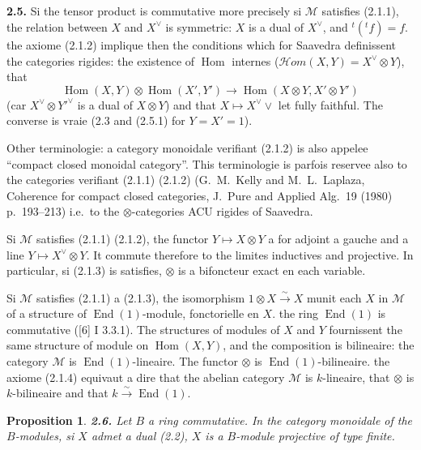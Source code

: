 \documentclass[12pt,a4paper]{article}
\theoremstyle{plain}
\newtheorem{proposition}[theorem]{Proposition}
\theoremstyle{definition}
\theoremstyle{remark}
\DeclareMathOperator{\Hom}{Hom}
\DeclareMathOperator{\End}{End}
\begin{document}
\subsection{}

\textbf{2.5.} Si the tensor product is commutative more precisely si $\mathcal{M}$ satisfies (2.1.1), the relation between $X$ and $X^\vee$ is symmetric: $X$ is a dual of $X^\vee$, and ${}^t({}^t f) = f$. the axiome (2.1.2) implique then the conditions which for Saavedra definissent the categories rigides: the existence of $\Hom$ internes ($\mathcal{H}om(X,Y) = X^\vee \otimes Y$), that
\begin{equation}\label{eq:2.5.1}
\Hom(X,Y) \otimes \Hom(X',Y') \to \Hom(X \otimes Y, X' \otimes Y')
\end{equation}
(car $X^\vee \otimes Y'^\vee$ is a dual of $X \otimes Y$) and that $X \mapsto X^\vee \vee$ let fully faithful. The converse is vraie (2.3 and (2.5.1) for $Y = X' = 1$).

Other terminologie: a category monoidale verifiant (2.1.2) is also appelee ``compact closed monoidal category''. This terminologie is parfois reservee also to the categories verifiant (2.1.1) (2.1.2) (G.~M.~Kelly and M.~L.~Laplaza, Coherence for compact closed categories, J.~Pure and Applied Alg.~19 (1980) p.~193--213) i.e.~to the $\otimes$-categories ACU rigides of Saavedra.

Si $\mathcal{M}$ satisfies (2.1.1) (2.1.2), the functor $Y \mapsto X \otimes Y$ a for adjoint a gauche and a line $Y \mapsto X^\vee \otimes Y$. It commute therefore to the limites inductives and projective. In particular, si (2.1.3) is satisfies, $\otimes$ is a bifoncteur exact en each variable.

Si $\mathcal{M}$ satisfies (2.1.1) a (2.1.3), the isomorphism $1 \otimes X \xrightarrow{\sim} X$ munit each $X$ in $\mathcal{M}$ of a structure of $\End(1)$-module, fonctorielle en $X$. the ring $\End(1)$ is commutative ([6] I 3.3.1). The structures of modules of $X$ and $Y$ fournissent the same structure of module on $\Hom(X,Y)$, and the composition is bilineaire: the category $\mathcal{M}$ is $\End(1)$-lineaire. The functor $\otimes$ is $\End(1)$-bilineaire. the axiome (2.1.4) equivaut a dire that the abelian category $\mathcal{M}$ is $k$-lineaire, that $\otimes$ is $k$-bilineaire and that $k \xrightarrow{\sim} \End(1)$.

\begin{proposition}\label{prop:2.6}
\textbf{2.6.} Let $B$ a ring commutative. In the category monoidale of the $B$-modules, si $X$ admet a dual (2.2), $X$ is a $B$-module projective of type finite.
\end{proposition}
\end{document}
